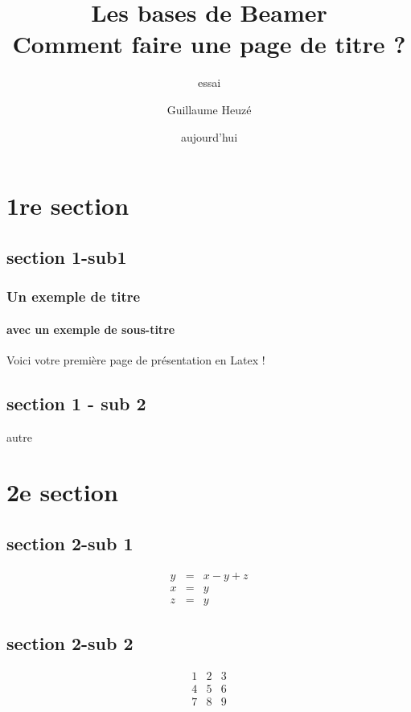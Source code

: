 \documentclass{beamer} %
\title[Faire une présentation en Latex avec Beamer]{Les bases de Beamer\\Comment faire une page de titre ?}
\subtitle{essai}
\author{Guillaume Heuzé}
\institute{Santé publique France}
\date{aujourd'hui}
\begin{document}
\begin{frame}
\titlepage
\end{frame}

\section{1re section}
\subsection{section 1-sub1}
	\begin{frame}[label=pagebanale]
	\frametitle{Un exemple de titre}
	\framesubtitle{avec un exemple de sous-titre}
	Voici votre première page de présentation en Latex !
	\end{frame}

\subsection{section 1 - sub 2}
	\begin{frame}
	autre
	\end{frame}

\section{2e section}
\subsection{section 2-sub 1}
	\begin{frame}
	\begin{align}
	y &=& x - y + z\\
	x &=& y\\
	z &=&y
	\end{align}
	\end{frame}

\subsection{section 2-sub 2}
	\begin{frame}
	\[
	\begin{matrix}
	1 & 2 & 3 \\
	4 & 5 & 6 \\
	7 & 8 & 9 
	\end{matrix}
	\]
	\end{frame}
\end{document}
